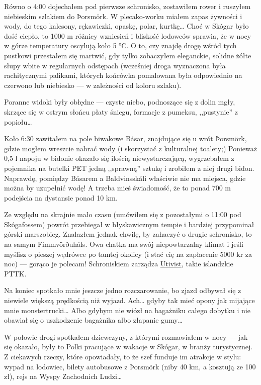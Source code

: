 Równo o 4:00 dojechałem pod pierwsze schronisko, zostawiłem rower i ruszyłem niebieskim szlakiem do Þorsmörk. W plecako-worku miałem zapas żywności i wody, do tego kalesony, rękawiczki, opaskę, polar, kurtkę… Choć w Skógar było dość ciepło, to 1000 m różnicy wzniesień i bliskość lodowców sprawia, że w nocy w górze temperatury oscylują koło 5 °C. O to, czy znajdę drogę wśród tych pustkowi przestałem się martwić, gdy tylko zobaczyłem eleganckie, solidne żółte słupy wbite w regularnych odstępach (wcześniej droga wyznaczona była rachitycznymi palikami, których końcówka pomalowana była odpowiednio na czerwono lub niebiesko --- w zależności od koloru szlaku).

Poranne widoki były obłędne --- czyste niebo, podnoszące się z dolin mgły, skrzące się w ostrym słońcu płaty śniegu, formacje z pumeksu, ,,pustynie'' z popiołu…


Koło 6:30 zawitałem na pole biwakowe Básar,  znajdujące się u wrót Þorsmörk, gdzie mogłem wreszcie nabrać wody (i skorzystać z kulturalnej toalety;) Ponieważ 0,5 l napoju w bidonie okazało się ilością niewystarczającą, wygrzebałem z pojemnika na butelki PET jedną ,,sprawną'' sztukę i zrobiłem z niej drugi bidon. Naprawdę, pomiędzy Básarem a Baldvinsskáli właściwie nie ma miejsca, gdzie można by uzupełnić wodę! A trzeba mieś świadomość, że to ponad 700 m podejścia na dystansie ponad 10 km.

Ze względu na skrajnie mało czasu (umówiłem się z pozostałymi o 11:00 pod Skógafossem) powrót przebiegał w błyskawicznym tempie i bardziej przypominał górski marszobieg. Znalazłem jednak chwilę, by zahaczyć o drugie schronisko, to na samym Fimmvörðuháls. Owa chatka ma swój niepowtarzalny klimat i jeśli myślisz o pieszej wędrówce po tamtej okolicy (i stać cię na zapłacenie 5000 kr za noc) --- gorąco je polecam! Schroniskiem zarządza \href{http://www.utivist.is/english}{Utivist}, takie islandzkie PTTK.

Na koniec spotkało mnie jeszcze jedno rozczarowanie, bo zjazd odbywał się z niewiele większą prędkością niż wyjazd. Ach… gdyby tak mieć opony jak mijające mnie monstertrucki… Albo gdybym nie wiózł na bagażniku całego dobytku i nie obawiał się o uszkodzenie bagażnika albo złapanie gumy…

W połowie drogi spotkałem dziewczyny, z którymi rozmawiałem w nocy --- jak się okazało, były to Polki pracujące w wakacje w Skógar, w branży turystycznej. Z ciekawych rzeczy, które opowiadały, to że szef funduje im atrakcje w stylu: wypad na lodowiec, bilety autobusowe z Þorsmörk (niby 40 km, a kosztują ze 100 zł), rejs na Wyspy Zachodnich Ludzi…

